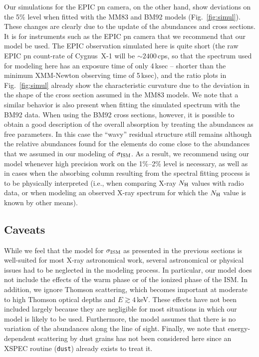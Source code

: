 \documentclass{aastex}
\newcommand{\nH}{\ensuremath{N_{\rm H}}}
\newcommand{\sigism}{\ensuremath{\sigma_{\rm ISM}}}
\begin{document}
Our simulations for the EPIC pn camera, on the other hand, show
deviations on the 5\% level when fitted with the MM83 and BM92 models
(Fig.~\ref{fig:simul}). These changes are clearly due to the update of
the abundances and cross sections. It is for instruments such as the
EPIC pn camera that we recommend that our model be used. The EPIC
observation simulated here is quite short (the raw EPIC pn count-rate
of Cygnus~X-1 will be $\sim 2400$\,cps, so that the spectrum used for
modeling here has an exposure time of only 4\,ksec -- shorter than the
minimum XMM-Newton observing time of 5\,ksec), and the ratio plots in
Fig.~\ref{fig:simul} already show the characteristic curvature due to
the deviation in the shape of the cross section assumed in the MM83
models. We note that a similar behavior is also present when fitting
the simulated spectrum with the BM92 data.  When using the BM92 cross
sections, however, it is possible to obtain a good description of the
overall absorption by treating the abundances as free parameters.  In
this case the ``wavy'' residual structure still remains although the
relative abundances found for the elements do come close to the
abundances that we assumed in our modeling of $\sigism$. As a result,
we recommend using our model whenever high precision work on the
1\%--2\% level is necessary, as well as in cases when the absorbing
column resulting from the spectral fitting process is to be physically
interpreted (i.e., when comparing X-ray $\nH$ values with radio data,
or when modeling an observed X-ray spectrum for which the $\nH$ value
is known by other means).

\subsection{Caveats}
While we feel that the model for $\sigism$ as presented in the
previous sections is well-suited for most X-ray astronomical work,
several astronomical or physical issues had to be neglected in the
modeling process. In particular, our model does not include the
effects of the warm phase or of the ionized phase of the ISM.  In
addition, we ignore Thomson scattering, which becomes important at
moderate to high Thomson optical depths and $E\gtrsim 4$\,keV.  These
effects have not been included largely because they are negligible for
most situations in which our model is likely to be used.  Furthermore,
the model assumes that there is no variation of the abundances along
the line of sight. Finally, we note that energy-dependent
scattering by dust grains has not been considered here since an
XSPEC routine (\texttt{dust}) already exists to treat it.
\end{document}
